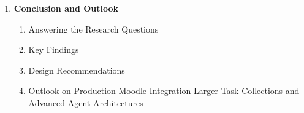 \documentclass[11pt,a4paper,oneside,ngerman]{memoir}
\begin{document}
\begin{enumerate}
\begin{enumerate}
        \item Compliance with Hint Levels and Solution Disclosure
        \item Suitability of the Self-Hosted LLM
        \item Limitations of the Prototype
    \end{enumerate}
    \item \textbf{Conclusion and Outlook}
    \begin{enumerate}
        \item Answering the Research Questions
        \item Key Findings
        \item Design Recommendations
        \item Outlook on Production Moodle Integration Larger Task Collections and Advanced Agent Architectures
    \end{enumerate}
\end{enumerate}
\cleardoublepage
\printbibliography[
    heading=bibintoc,
    title={References}
]
\end{document}
